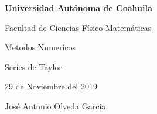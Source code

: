 \documentclass{article}
\begin{document}
\begin{center}
{\Large \textbf{Universidad Autónoma de Coahuila}}
\end{center}

\begin{center}
{\large Facultad de Ciencias Físico-Matemáticas}
\end{center}

\begin{center}
{\large Metodos Numericos}
\end{center}

\begin{center}
{\large Series de Taylor}
\end{center}

\begin{center}
{\large 29 de Noviembre del 2019}
\end{center}

\begin{center}
{\large José Antonio Olveda García}
\end{center}

\vspace{5mm}
\end{document}
